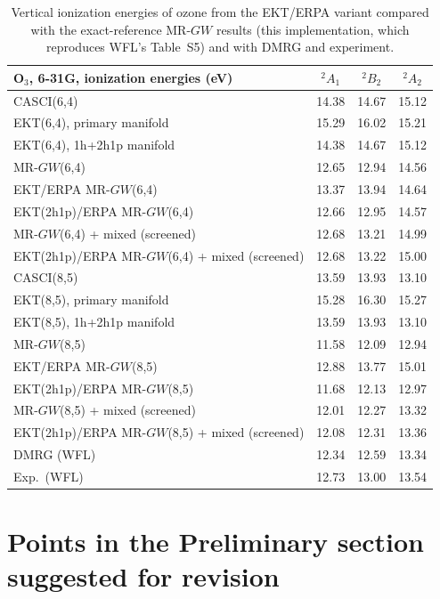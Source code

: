 \documentclass[11pt,a4paper]{article}
\newcommand{\MRGW}{MR-$GW$}
\newcommand{\WFL}{WFL}
\newcommand{\Pre}{Preliminary section}
\begin{document}
\begin{table}[h!]
\centering
\small
\begin{tabular}{lccc}
\toprule
O$_3$, 6-31G, ionization energies (eV) & $^2A_1$ & $^2B_2$ & $^2A_2$\\
\midrule
CASCI(6,4) & 14.38 & 14.67 & 15.12\\
EKT(6,4), primary manifold & 15.29 & 16.02 & 15.21\\
EKT(6,4), 1h+2h1p manifold & 14.38 & 14.67 & 15.12\\
\MRGW(6,4) & 12.65 & 12.94 & 14.56\\
EKT/ERPA \MRGW(6,4) & 13.37 & 13.94 & 14.64\\
EKT(2h1p)/ERPA \MRGW(6,4) & 12.66 & 12.95 & 14.57\\
\MRGW(6,4) + mixed (screened) & 12.68 & 13.21 & 14.99\\
EKT(2h1p)/ERPA \MRGW(6,4) + mixed (screened) & 12.68 & 13.22 & 15.00\\
\midrule
CASCI(8,5) & 13.59 & 13.93 & 13.10\\
EKT(8,5), primary manifold & 15.28 & 16.30 & 15.27\\
EKT(8,5), 1h+2h1p manifold & 13.59 & 13.93 & 13.10\\
\MRGW(8,5) & 11.58 & 12.09 & 12.94\\
EKT/ERPA \MRGW(8,5) & 12.88 & 13.77 & 15.01\\
EKT(2h1p)/ERPA \MRGW(8,5) & 11.68 & 12.13 & 12.97\\
\MRGW(8,5) + mixed (screened) & 12.01 & 12.27 & 13.32\\
EKT(2h1p)/ERPA \MRGW(8,5) + mixed (screened) & 12.08 & 12.31 & 13.36\\
\midrule
DMRG (\WFL) & 12.34 & 12.59 & 13.34\\
Exp.\ (\WFL) & 12.73 & 13.00 & 13.54\\
\bottomrule
\end{tabular}
\caption{Vertical ionization energies of ozone from the EKT/ERPA variant
compared with the exact-reference \MRGW{} results (this implementation,
which reproduces \WFL{}'s Table~S5) and with DMRG and experiment.}
\label{tab:ekt-o3}
\end{table}

\section{Points in the \Pre{} suggested for revision}
\label{sec:revisions}
\end{document}
